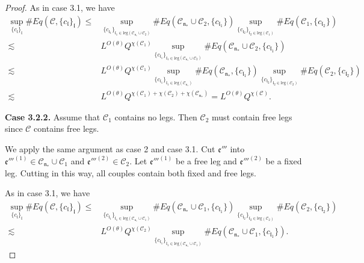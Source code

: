 \begin{proof}
    As in case 3.1, we have
    \begin{equation}
    \begin{split}
     \sup_{\{c_{\mathfrak{l}}\}_{\mathfrak{l}}}\#Eq(\mathcal{C},\{c_{\mathfrak{l}}\}_{\mathfrak{l}})
     \le&
     \sup_{\{c_{\mathfrak{l}_1}\}_{\mathfrak{l}_1\in \text{leg}(\mathcal{C}_{\mathfrak{n}_*}\cup \mathcal{C}_2)} } \# Eq(\mathcal{C}_{\mathfrak{n}_*}\cup \mathcal{C}_2,\{c_{\mathfrak{l}_1}\}) \sup_{\{c_{\mathfrak{l}_2}\}_{\mathfrak{l}_2\in \text{leg}(\mathcal{C}_1)} }\# Eq(\mathcal{C}_{1}, \{c_{\mathfrak{l}_2}\})
     \\
     \lesssim& L^{O(\theta)} Q^{\chi(\mathcal{C}_1)}\sup_{\{c_{\mathfrak{l}_1}\}_{\mathfrak{l}_1\in \text{leg}(\mathcal{C}_{\mathfrak{n}_*}\cup \mathcal{C}_2)} } \# Eq(\mathcal{C}_{\mathfrak{n}_*}\cup \mathcal{C}_2,\{c_{\mathfrak{l}_1}\})
     \\
     \lesssim& L^{O(\theta)} Q^{\chi(\mathcal{C}_1)} \sup_{\{c_{\mathfrak{l}_1}\}_{\mathfrak{l}_1\in \text{leg}(\mathcal{C}_{\mathfrak{n}_*})} } \# Eq(\mathcal{C}_{\mathfrak{n}_*},\{c_{\mathfrak{l}_1}\}) \sup_{\{c_{\mathfrak{l}_2}\}_{\mathfrak{l}_2\in \text{leg}(\mathcal{C}_2)} }\# Eq(\mathcal{C}_{2}, \{c_{\mathfrak{l}_2}\})
     \\
     \lesssim& L^{O(\theta)} Q^{\chi(\mathcal{C}_1)+\chi(\mathcal{C}_2)+\chi(\mathcal{C}_{\mathfrak{n}_*})}=L^{O(\theta)} Q^{\chi(\mathcal{C})}.
    \end{split}
    \end{equation}
    
    \textbf{Case 3.2.2.} Assume that $\mathcal{C}_1$ contains no legs. Then $\mathcal{C}_2$ must contain free legs since $\mathcal{C}$ contains free legs. 
    
    We apply the same argument as case 2 and case 3.1. Cut $\mathfrak{e}'''$ into $\mathfrak{e}'''^{(1)}\in \mathcal{C}_{\mathfrak{n}_*}\cup \mathcal{C}_1$ and $\mathfrak{e}'''^{(2)}\in \mathcal{C}_2$. Let $\mathfrak{e}'''^{(1)}$ be a free leg and $\mathfrak{e}'''^{(2)}$ be a fixed leg. Cutting in this way, all couples contain both fixed and free legs.
    
    As in case 3.1, we have
    \begin{equation}\label{eq.case3.2.2expand.fourwave}
    \begin{split}
     \sup_{\{c_{\mathfrak{l}}\}_{\mathfrak{l}}}\#Eq(\mathcal{C},\{c_{\mathfrak{l}}\}_{\mathfrak{l}})
     \le&
     \sup_{\{c_{\mathfrak{l}_1}\}_{\mathfrak{l}_1\in \text{leg}(\mathcal{C}_{\mathfrak{n}_*}\cup \mathcal{C}_1)} } \# Eq(\mathcal{C}_{\mathfrak{n}_*}\cup \mathcal{C}_1,\{c_{\mathfrak{l}_1}\}) \sup_{\{c_{\mathfrak{l}_2}\}_{\mathfrak{l}_2\in \text{leg}(\mathcal{C}_2)} }\# Eq(\mathcal{C}_{2}, \{c_{\mathfrak{l}_2}\})
     \\
     \lesssim& L^{O(\theta)} Q^{\chi(\mathcal{C}_2)}\sup_{\{c_{\mathfrak{l}_1}\}_{\mathfrak{l}_1\in \text{leg}(\mathcal{C}_{\mathfrak{n}_*}\cup \mathcal{C}_1)} } \# Eq(\mathcal{C}_{\mathfrak{n}_*}\cup \mathcal{C}_1,\{c_{\mathfrak{l}_1}\}).
    \end{split}
    \end{equation}
    

\end{proof}
